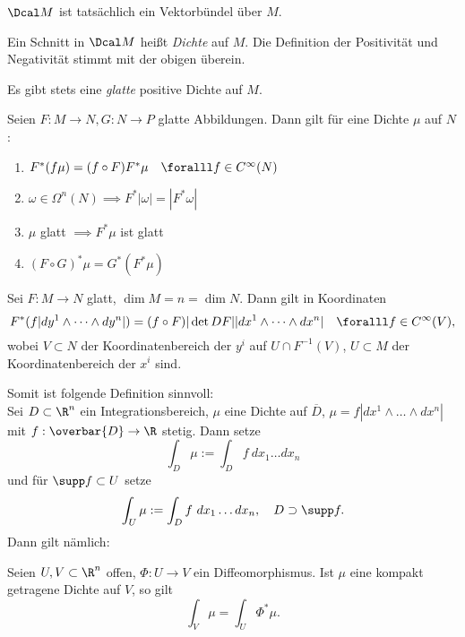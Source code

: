 \begin{lem}\autolabel
	\( \Dcal M \) ist tatsächlich ein Vektorbündel über $M$.
\end{lem}

Ein Schnitt in $\Dcal M$ heißt \emph{Dichte} auf $M$. Die Definition der Positivität und Negativität stimmt mit der obigen überein.

\begin{lem}\autolabel
	Es gibt stets eine \emph{glatte} positive Dichte auf $M$.
\end{lem}

\begin{lem}\autolabel
	Seien \( F: M \to N, G: N \to P \) glatte Abbildungen. Dann gilt für eine Dichte $\mu$ auf $N$:
	\begin{enumerate}[label={\roman*})]
		\item \( F^*(f\mu) = (f \circ F)F^*\mu \quad \foralll f \in C^\infty(N) \)
		\item \( \omega \in \Omega^n(N) \implies F^*|\omega| = |F^*\omega| \)
		\item $\mu$ glatt $\implies F^*\mu$ ist glatt
		\item \( (F \circ G)^* \mu = G^*(F^*\mu) \)
	\end{enumerate}
\end{lem}

\begin{lem}\autolabel
	Sei $F:M \to N$ glatt, \( \dim M = n = \dim N \). Dann gilt in Koordinaten
	\[ F^*(f |dy^1 \wedge \dots \wedge dy^n|) = (f\circ F) |\det DF| |dx^1 \wedge \dots \wedge dx^n| \quad \foralll f \in C^\infty(V), \]
	wobei $V \subset N$ der Koordinatenbereich der $y^i$ auf \( U \cap F^{-1}(V) \), \( U \subset M \) der Koordinatenbereich der $x^i$ sind.
\end{lem}

Somit ist folgende Definition sinnvoll:\\
Sei $D \subset \R^n$ ein Integrationsbereich, \( \mu \) eine Dichte auf $\overbar{D}$, \( \mu = f |dx^1 \wedge \dots \wedge dx^n| \) mit $f: \overbar{D} \to \R$ stetig. Dann setze
\[ \int_D \mu := \int_D f \ dx_1 \dots dx_n \]
und für \( \supp f \subset U \) setze
\[ \int_U \mu := \int_D f \ dx_1 \dots dx_n, \quad D \supset \supp f. \]
Dann gilt nämlich:

\begin{lem}\autolabel
	Seien \( U,V \subset \R^n \) offen, \( \Phi: U \to V \) ein Diffeomorphismus. Ist $\mu$ eine kompakt getragene Dichte auf $V$, so gilt
	\[ \int_V \mu = \int_U \Phi^*\mu. \]
\end{lem}

